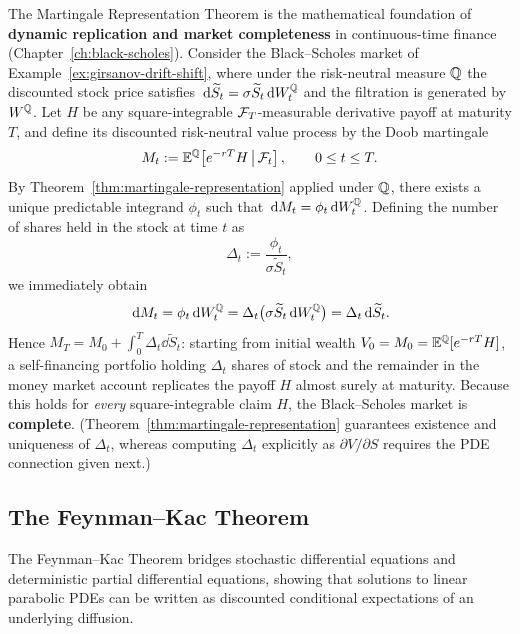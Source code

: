 The Martingale Representation Theorem is the mathematical foundation of \textbf{dynamic replication and market completeness} in continuous-time finance (Chapter~\ref{ch:black-scholes}). Consider the Black--Scholes market of Example~\ref{ex:girsanov-drift-shift}, where under the risk-neutral measure $\mathbb{Q}$ the discounted stock price satisfies $\,\mathrm{d}\widetilde{S}_t = \sigma \widetilde{S}_t \,\mathrm{d} W_t^{\mathbb{Q}}$ and the filtration is generated by $W^{\mathbb{Q}}$. Let $H$ be any square-integrable $\mathcal{F}_T$-measurable derivative payoff at maturity $T$, and define its discounted risk-neutral value process by the Doob martingale
\[
M_t := \mathbb{E}^{\mathbb{Q}}\!\left[e^{-rT} H \,\middle|\, \mathcal{F}_t\right], \qquad 0 \le t \le T.
\]
By Theorem~\ref{thm:martingale-representation} applied under $\mathbb{Q}$, there exists a unique predictable integrand $\phi_t$ such that $\,\mathrm{d} M_t = \phi_t \,\mathrm{d} W_t^{\mathbb{Q}}$. Defining the number of shares held in the stock at time $t$ as
\[
\Delta_t := \frac{\phi_t}{\sigma \widetilde{S}_t},
\]
we immediately obtain
\[
\,\mathrm{d} M_t = \phi_t \,\mathrm{d} W_t^{\mathbb{Q}} = \Delta_t \big(\sigma \widetilde{S}_t \,\mathrm{d} W_t^{\mathbb{Q}}\big) = \Delta_t \,\mathrm{d}\widetilde{S}_t.
\]
Hence $M_T = M_0 + \int_0^T \Delta_t \dd\widetilde{S}_t$: starting from initial wealth $V_0 = M_0 = \mathbb{E}^{\mathbb{Q}}[e^{-rT} H]$, a self-financing portfolio holding $\Delta_t$ shares of stock and the remainder in the money market account replicates the payoff $H$ almost surely at maturity. Because this holds for \emph{every} square-integrable claim $H$, the Black--Scholes market is \textbf{complete}. (Theorem~\ref{thm:martingale-representation} guarantees existence and uniqueness of $\Delta_t$, whereas computing $\Delta_t$ explicitly as $\partial V / \partial S$ requires the PDE connection given next.)

\subsection{The Feynman--Kac Theorem}
\label{subsec:feynman-kac}

The Feynman--Kac Theorem bridges stochastic differential equations and deterministic partial differential equations, showing that solutions to linear parabolic PDEs can be written as discounted conditional expectations of an underlying diffusion.

